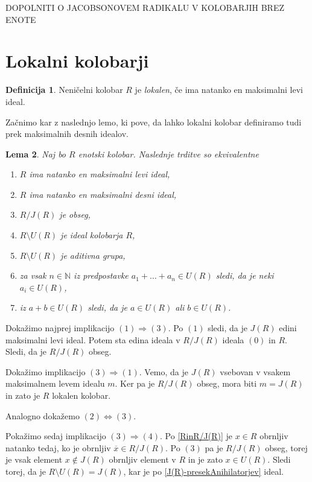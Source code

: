 \documentclass[a4paper, 12pt]{amsart}
\theoremstyle{definition} %
\newtheorem{definicija}{Definicija}[section]
\theoremstyle{plain} %
\newtheorem{lema}[definicija]{Lema}
\newcommand{\N}{\mathbb N}
\begin{document}
DOPOLNITI O JACOBSONOVEM RADIKALU V KOLOBARJIH BREZ ENOTE

\section{Lokalni kolobarji}

\begin{definicija}
Neničelni kolobar $R$ je \emph{lokalen}, če ima natanko en maksimalni levi ideal.
\end{definicija}

Začnimo kar z naslednjo lemo, ki pove, da lahko lokalni kolobar definiramo tudi prek maksimalnih desnih idealov.

\begin{lema}
Naj bo $R$ enotski kolobar. Naslednje trditve so ekvivalentne
\begin{enumerate}
\item $R$ ima natanko en maksimalni levi ideal,
\item $R$ ima natanko en maksimalni desni ideal,
\item $R/J(R)$ je obseg,
\item $R\setminus U(R)$ je ideal kolobarja $R$,
\item $R\setminus U(R)$ je aditivna grupa,
\item za vsak $n\in \N$ iz predpostavke $a_1 + \dots + a_n \in U(R)$ sledi, da je neki $a_i \in U(R)$,
\item iz $a+b\in U(R)$ sledi, da je $a\in U(R)$ ali $b\in U(R)$.
\end{enumerate}
\end{lema}

\proof
Dokažimo najprej implikacijo $(1) \Rightarrow (3)$. Po $(1)$ sledi, da je $J(R)$ edini maksimalni levi ideal. Potem sta edina ideala v $R/J(R)$ ideala $(0)$ in $R$. Sledi, da je $R/J(R)$ obseg.

Dokažimo implikacijo $(3) \Rightarrow (1)$. Vemo, da je $J(R)$ vsebovan v vsakem maksimalnem levem idealu $m$. Ker pa je $R/J(R)$ obseg, mora biti $m=J(R)$ in zato je $R$ lokalen kolobar.

Analogno dokažemo $(2) \Leftrightarrow (3)$.

Pokažimo sedaj implikacijo $(3) \Rightarrow (4)$. Po \ref{RinR/J(R)} je $x\in R$ obrnljiv natanko tedaj, ko je obrnljiv $\overline{x}\in R/J(R)$. Po $(3)$ pa je $R/J(R)$ obseg, torej je vsak element $x\notin J(R)$ obrnljiv element v $R$ in je zato $x\in U(R)$. Sledi torej, da je $R\setminus U(R) = J(R)$, kar je po \ref{J(R)-presekAnihilatorjev} ideal.
\end{document}
